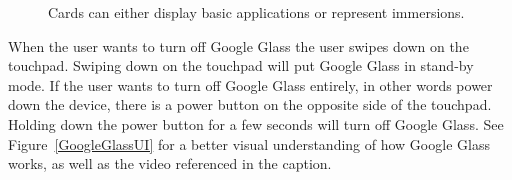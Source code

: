 	\begin{figure}[ht!]
		\centering
  	 \qquad
   	\qquad
   	\qquad
		\caption{Cards can either display basic applications or represent immersions.}
		\label{GoogleGlassCards}
	\end{figure}

When the user wants to turn off Google Glass the user swipes down on the touchpad. Swiping down on the touchpad will put Google Glass in stand-by mode. If the user wants to turn off Google Glass entirely, in other words power down the device, there is a power button on the opposite side of the touchpad. Holding down the power button for a few seconds will turn off Google Glass. See Figure~\ref{GoogleGlassUI} for a better visual understanding of how Google Glass works, as well as the video referenced in the caption.

